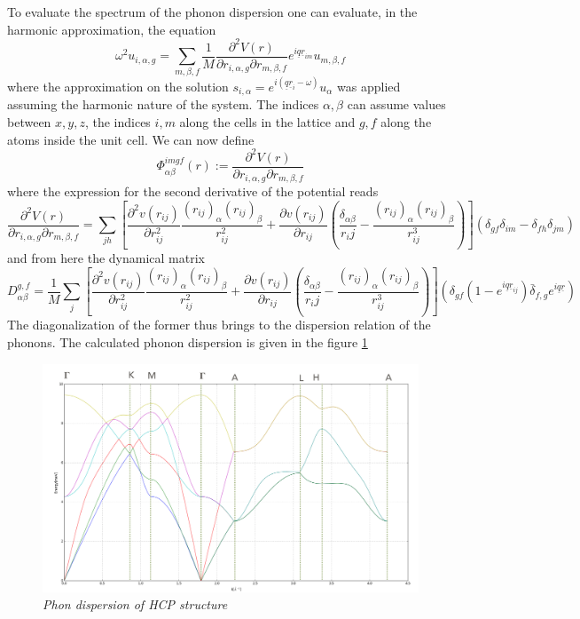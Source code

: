 \documentclass[a4paper]{article}
\begin{document}
    To evaluate the spectrum of the phonon dispersion one can evaluate, in the harmonic approximation, the equation 
    \begin{equation}
        \omega^2 u_{i,\alpha, g} = \sum_{m,\beta,f} \frac{1}{M}\frac{\partial^2 V(r)}{\partial r_{i,\alpha, g}\partial r_{m,\beta,f}}e^{i\underline{q}\underline{r}_{im}}u_{m,\beta, f}
    \end{equation}
    where the approximation on the solution $s_{i,\alpha}=e^{i(\underline{q}\underline{r}_i - \omega)}u_{\alpha}$ was applied assuming the harmonic nature of the system.
    The indices $\alpha,\beta$ can assume values between $x,y,z$, the indices $i,m$ along the cells in the lattice and $g,f$ along the atoms inside the unit cell.
    We can now define 
    \begin{equation}
        \Phi_{\alpha\beta}^{imgf}(r):=\frac{\partial^2 V(r)}{\partial r_{i,\alpha,g}\partial r_{m,\beta,f}}
    \end{equation}
    where the expression for the second derivative of the potential reads
    \begin{equation*}
        \frac{\partial^2 V(r)}{\partial r_{i,\alpha,g}\partial r_{m,\beta,f}} = \sum_{jh}\left[\frac{\partial^2 v(r_{ij})}{\partial r_{ij}^2}\frac{(r_{ij})_{\alpha}(r_{ij})_{\beta}}{r_{ij}^2} + \frac{\partial v(r_{ij})}{\partial r_{ij}}\left(\frac{\delta_{\alpha\beta}}{r_ij}-\frac{(r_{ij})_{\alpha}(r_{ij})_{\beta}}{r_{ij}^3}\right)\right](\delta_{gf}\delta_{im}-\delta_{fh}\delta_{jm})
    \end{equation*}
    and from here the dynamical matrix
    \begin{equation}
        D_{\alpha\beta}^{g,f} = \frac{1}{M}\sum_j\left[\frac{\partial^2 v(r_{ij})}{\partial r_{ij}^2}\frac{(r_{ij})_{\alpha}(r_{ij})_{\beta}}{r_{ij}^2} + \frac{\partial v(r_{ij})}{\partial r_{ij}}\left(\frac{\delta_{\alpha\beta}}{r_ij}-\frac{(r_{ij})_{\alpha}(r_{ij})_{\beta}}{r_{ij}^3}\right)\right]\left(\delta_{gf}(1-e^{i\underline{q}\underline{r}_{ij}}) \bar{\delta}_{f,g}e^{i\underline{q}\underline{r}}\right)
    \end{equation}
    The diagonalization of the former thus brings to the dispersion relation of the phonons. The calculated phonon dispersion is given in the figure \ref{phonon-hcp}
    \begin{figure}[h]
        \centering
        \includegraphics[width=12cm]{phonon_hcp.png}
        \caption{\it \label{phonon-hcp}Phon dispersion of HCP structure}
    \end{figure}
\end{document}
